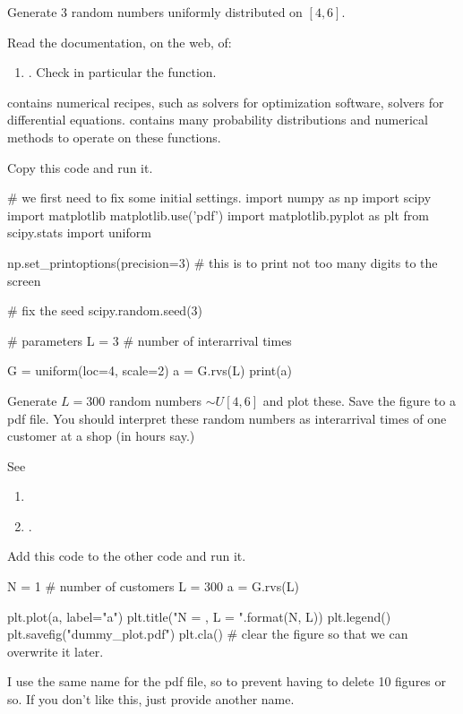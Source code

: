\documentclass{scrartcl}
\begin{document}
\begin{exercise}
  Generate 3 random numbers uniformly distributed on $[4,6]$. 

  Read the documentation, on the web, of:
  \begin{enumerate}
  \item  {}.  Check in particular the  function. 
  \end{enumerate}

 contains numerical recipes, such as solvers for optimization software, solvers for differential equations.  contains many probability distributions and numerical methods to operate on these functions. 
\begin{solution}
Copy this code and run it.
\begin{pyverbatim}
# we first need to fix some initial settings.
import numpy as np
import scipy
import matplotlib
matplotlib.use('pdf') 
import matplotlib.pyplot as plt
from scipy.stats import uniform

np.set_printoptions(precision=3) # this is to print not too many digits to the screen

# fix the seed
scipy.random.seed(3) 

# parameters
L = 3  # number of interarrival times

G = uniform(loc=4, scale=2) 
a = G.rvs(L)
print(a)
\end{pyverbatim}
  
\end{solution}

\end{exercise}


\begin{exercise}
Generate $L=300$ random numbers $\sim U[4,6]$ and plot these. Save the figure to a pdf file. You should interpret these random numbers as interarrival times of one customer at a shop (in hours say.)

See
\begin{enumerate}
\item  {}
\item {}.
\end{enumerate}
\begin{solution}
Add this code to the other code and run it.
\begin{pyverbatim}
N = 1 # number of customers
L = 300
a = G.rvs(L)

plt.plot(a, label="a")
plt.title("N = {}, L = {}".format(N, L))
plt.legend()
plt.savefig("dummy_plot.pdf")
plt.cla() # clear the figure so that we can overwrite it later.
\end{pyverbatim}
I use the same name for the pdf file, so to prevent having to delete 10 figures or so. If you don't like this, just provide another name. 
\end{solution}
\end{exercise}
\end{document}
